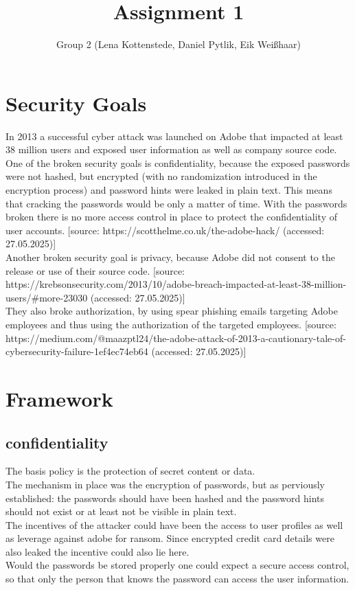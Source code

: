 \documentclass{article}
\title{Assignment 1}
\author{Group 2 (Lena Kottenstede, Daniel Pytlik, Eik Weißhaar)}
\begin{document}
\maketitle

\section{Security Goals}
In 2013 a successful cyber attack was launched on Adobe that impacted at least 38 million users and exposed user information as well as company source code.\\
\newline
One of the broken security goals is confidentiality, because the exposed passwords were not hashed, but encrypted (with no randomization introduced in the encryption process) and password hints were leaked in plain text. This means that cracking the passwords would be only a matter of time. With the passwords broken there is no more access control in place to protect the confidentiality of user accounts. [source: https://scotthelme.co.uk/the-adobe-hack/ (accessed: 27.05.2025)]\\
\newline
Another broken security goal is privacy, because Adobe did not consent to the release or use of their source code. [source: https://krebsonsecurity.com/2013/10/adobe-breach-impacted-at-least-38-million-users/\#more-23030 (accessed: 27.05.2025)] \\
\newline
They also broke authorization, by using spear phishing emails targeting Adobe employees and thus using the authorization of the targeted employees. [source: https://medium.com/@maazptl24/the-adobe-attack-of-2013-a-cautionary-tale-of-cybersecurity-failure-1ef4ec74eb64 (accessed: 27.05.2025)]

\section{Framework}

\subsection{confidentiality}
The basis policy is the protection of secret content or data.\\ \newline
The mechanism in place was the encryption of passwords, but as perviously established: the passwords should have been hashed and the password hints should not exist or at least not be visible in plain text.\\ \newline
The incentives of the attacker could have been the access to user profiles as well as leverage against adobe for ransom. Since encrypted credit card details were also leaked the incentive could also lie here.\\ \newline
Would the passwords be stored properly one could expect a secure access control, so that only the person that knows the password can access the user information.
\end{document}
